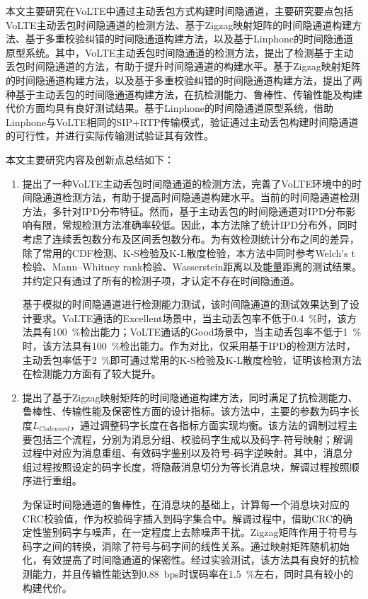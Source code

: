 \begin{conclusion}

本文主要研究在VoLTE中通过主动丢包方式构建时间隐通道，主要研究要点包括VoLTE主动丢包时间隐通道的检测方法、基于Zigzag映射矩阵的时间隐通道构建方法、基于多重校验纠错的时间隐通道构建方法，以及基于Linphone的时间隐通道原型系统。其中，VoLTE主动丢包时间隐通道的检测方法，提出了检测基于主动丢包时间隐通道的方法，有助于提升时间隐通道的构建水平。基于Zigzag映射矩阵的时间隐通道构建方法，以及基于多重校验纠错的时间隐通道构建方法，提出了两种基于主动丢包的时间隐通道构建方法，在抗检测能力、鲁棒性、传输性能及构建代价方面均具有良好测试结果。基于Linphone的时间隐通道原型系统，借助Linphone与VoLTE相同的SIP+RTP传输模式，验证通过主动丢包构建时间隐通道的可行性，并进行实际传输测试验证其有效性。

本文主要研究内容及创新点总结如下：
\begin{enumerate}
    \item
    提出了一种VoLTE主动丢包时间隐通道的检测方法，完善了VoLTE环境中的时间隐通道检测方法，有助于提高时间隐通道构建水平。当前的时间隐通道检测方法，多针对IPD分布特征。然而，基于主动丢包的时间隐通道对IPD分布影响有限，常规检测方法准确率较低。因此，本方法除了统计IPD分布外，同时考虑了连续丢包数分布及区间丢包数分布。为有效检测统计分布之间的差异，除了常用的CDF检测、K-S检验及K-L散度检验，本方法中同时参考Welch's t检验、Mann–Whitney rank检验、Wasserstein距离以及能量距离的测试结果。并约定只有通过了所有的检测子项，才认定不存在时间隐通道。
    
    基于模拟的时间隐通道进行检测能力测试，该时间隐通道的测试效果达到了设计要求。VoLTE通话的Excellent场景中，当主动丢包率不低于{0.4\ \%}时，该方法具有{100\ \%}检出能力；VoLTE通话的Good场景中，当主动丢包率不低于{1\ \%}时，该方法具有{100\ \%}检出能力。作为对比，仅采用基于IPD的检测方法时，主动丢包率低于{2\ \%}即可通过常用的K-S检验及K-L散度检验，证明该检测方法在检测能力方面有了较大提升。
    
    \item
    提出了基于Zigzag映射矩阵的时间隐通道构建方法，同时满足了抗检测能力、鲁棒性、传输性能及保密性方面的设计指标。该方法中，主要的参数为码字长度$L_{Codeword}$，通过调整码字长度在各指标方面实现均衡。该方法的调制过程主要包括三个流程，分别为消息分组、校验码字生成以及码字-符号映射；解调过程中对应为消息重组、有效码字鉴别以及符号-码字逆映射。其中，消息分组过程按照设定的码字长度，将隐蔽消息切分为等长消息块，解调过程按照顺序进行重组。
    
    为保证时间隐通道的鲁棒性，在消息块的基础上，计算每一个消息块对应的CRC校验值，作为校验码字插入到码字集合中。解调过程中，借助CRC的确定性鉴别码字与噪声，在一定程度上去除噪声干扰。Zigzag矩阵作用于符号与码字之间的转换，消除了符号与码字间的线性关系。通过映射矩阵随机初始化，有效提高了时间隐通道的保密性。经过实验测试，该方法具有良好的抗检测能力，并且传输性能达到{0.88\ bps}时误码率在{1.5\ \%}左右，同时具有较小的构建代价。
    

\end{enumerate}
\end{conclusion}

